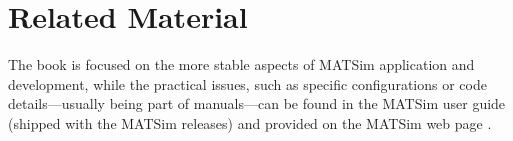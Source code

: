 \section*{Related Material}
The book is focused on the more stable aspects of MATSim application and development, while the practical issues, such as specific configurations or code details---usually being part of manuals---can be found in the MATSim user guide (shipped with the MATSim releases) and provided on the MATSim web page \citep[][]{MATSim_Userguide_2014}.

